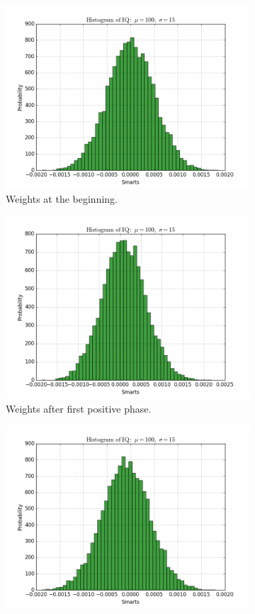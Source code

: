  \begin{figure}[h!]
	\centering
	\begin{subfigure}[t]{.24\textwidth}
  		\centering
  		\includegraphics[width=.9\linewidth]{imgs/app/nest/w_hist_conv1.png}
  		\caption{Weights at the beginning.}
  		\label{fig:sub1}
	\end{subfigure}%
	\begin{subfigure}[t]{.24\textwidth}
  		\centering
  		\includegraphics[width=.9\linewidth]{imgs/app/nest/w_hist_conv2.png}
  		\caption{Weights after first positive phase.}
  		\label{fig:sub2}
	\end{subfigure}
	\begin{subfigure}[t]{.24\textwidth}
  		\centering
  		\includegraphics[width=.9\linewidth]{imgs/app/nest/w_hist_conv3.png}

\end{subfigure}
\end{figure}
